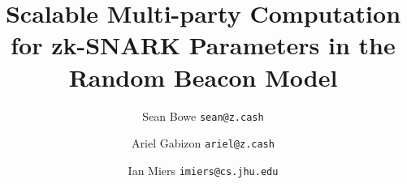 \documentclass{article}
\author{
   Sean Bowe
  \texttt{sean@z.cash}
  \and
  Ariel Gabizon 
  \texttt{ariel@z.cash}
  \and
  Ian Miers
  \texttt{imiers@cs.jhu.edu}
}
\title{Scalable Multi-party Computation for zk-SNARK
Parameters in the Random Beacon Model}
\DeclareMathOperator{\spn}{span}
\begin{document}
  \maketitle


\newif\ifdraft
\draftfalse

\newtheorem{thm}{Theorem}[section]
\newtheorem{conjecture}[thm]{Conjecture}
\newtheorem{definition}[thm]{Definition}
\newtheorem{dfn}[thm]{Definition}
\newtheorem{lemma}[thm]{Lemma}
\newtheorem{remark}[thm]{Remark}
\newtheorem{proposition}[thm]{Proposition}
\newtheorem{corollary}[thm]{Corollary}
\newtheorem{claim}[thm]{Claim}
\newtheorem{fact}[thm]{Fact}
\newtheorem{openprob}[thm]{Open Problem}
\newtheorem{remk}[thm]{Remark}
\newtheorem{example}[thm]{Example}
\newtheorem{apdxlemma}{Lemma}
\newcommand{\question}[1]{{\sf [#1]\marginpar{?}} }

\makeatletter
\newcommand*{\circled}{\@ifstar\circledstar\circlednostar}
\makeatother

\newcommand*\circledstar[1]{%
  \tikz[baseline=(C.base)]
    \node[%
      fill,
      circle,
      minimum size=1.35em,
      text=white,
      font=\sffamily,
      inner sep=0.5pt
    ](C) {#1};%
}
\newcommand*\circlednostar[1]{%
  \tikz[baseline=(C.base)]
    \node[%
      draw,
      circle,
      minimum size=1.35em,
      font=\sffamily,
      inner sep=0.5pt
    ](C) {#1};%
}

\providecommand{\bd}[1]{\circled{#1}}

\newcommand{\prob}{\mathrm{Pr}}
\newcommand{\E}{{\mathbb{E}}}
\newcommand{\R}{{\mathbb{R}}}
\newcommand{\calF}{{\cal{F}}}
\newcommand{\disp}[1]{D_{#1}}
\newcommand{\agree}{{\sf{agree}}}
\newcommand{\RS}{{\sf{RS}}}
\newcommand{\aRS}{{\sf{aRS}}}
\newcommand{\rrs}{R_{\aRS}}
\newcommand{\VRS}{V_\RS}
\newcommand{\set}[1]{\ensuremath{\left\{#1\right\}}\xspace}
\newcommand{\angles}[1]{\langle{#1}\rangle}
\newcommand{\condset}[2]{\set{#1 \mid #2 }}
\newcommand{\zo}{\set{0,1}}
\newcommand{\zon}{{\zo^n}}
\newcommand{\zom}{{\zo^m}}
\newcommand{\zok}{{\zo^}}
\newcommand{\eps}{\epsilon}
\newcommand{\e}{\eps}
\newcommand{\concat}{\circ}
\newcommand{\poly}{\ensuremath{\rm{poly(\lambda})}\xspace}
\newcommand{\itone}{{\it{(i)}}\xspace}
\newcommand{\ittwo}{{\it{(ii)}}\xspace}
\newcommand{\itthree}{{\it{(iii)}}\xspace}
\newcommand{\Fstar}{\ensuremath{\F^*}\xspace}
\newcommand{\itfour}{{\it{(iv)}}\xspace}
\newcommand{\cc}{{\rm{CC}}}
\newcommand{\rnk}{{\rm{rank}}}
\newcommand{\T}{T}
\newcommand{\I}{{\mathbb{I}}}
\ifdraft
\newcommand{\ariel}[1]{{\color{blue}{\textit{ariel:#1}}}}
\newcommand{\imm}[1]{{\color{red}{\textit{imm:#1}}}}
\end{document}
